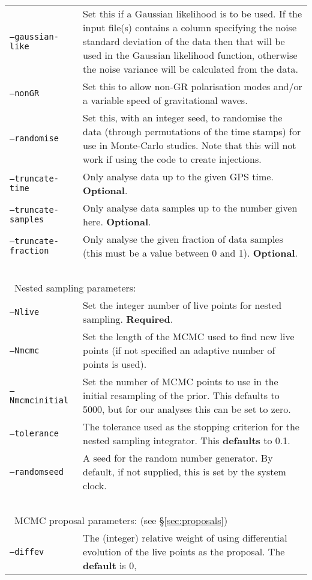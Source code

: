 \begin{footnotesize}
\begin{longtable}{|p{}p{}|}
 {\tt --gaussian-like}   &  Set this if a Gaussian likelihood is to be used. If the input file(s) contains a column specifying
                            the noise standard deviation of the data then that will be used in the Gaussian likelihood
                            function, otherwise the noise variance will be calculated from the data. \\
 {\tt --nonGR}           &  Set this to allow non-GR polarisation modes and/or a variable speed of gravitational waves. \\
 {\tt --randomise}       &  Set this, with an integer seed, to randomise the data (through permutations of the time stamps) for
                            use in Monte-Carlo studies. Note that this will not work if using the code to create injections. \\
 {\tt --truncate-time}   &  Only analyse data up to the given GPS time. {\bf Optional}. \\
 {\tt --truncate-samples}&  Only analyse data samples up to the number given here. {\bf Optional}. \\
 {\tt --truncate-fraction}& Only analyse the given fraction of data samples (this must be a value between 0 and 1). {\bf Optional}. \\
 ~ & ~ \\
\multicolumn{2}{|l|}{~Nested sampling parameters:} \\
 {\tt --Nlive}           &  Set the integer number of live points for nested sampling. {\bf Required}. \\
 {\tt --Nmcmc}           &  Set the length of the MCMC used to find new live points (if not specified an adaptive number of
                            points is used). \\
 {\tt --Nmcmcinitial}    &  Set the number of MCMC points to use in the initial resampling of the prior. This defaults to 5000, but
                            for our analyses this can be set to zero. \\
 {\tt --tolerance}       &  The tolerance used as the stopping criterion for the nested sampling integrator. This {\bf defaults} to 0.1. \\
 {\tt --randomseed}      &  A seed for the random number generator. By default, if not supplied, this is set by the system clock. \\
 ~ & ~ \\
\multicolumn{2}{|l|}{~MCMC proposal parameters: (see \S\ref{sec:proposals})} \\
 {\tt --diffev}          &  The (integer) relative weight of using differential evolution of the live points as the proposal. The {\bf default} is 0,

\end{longtable}
\end{footnotesize}
